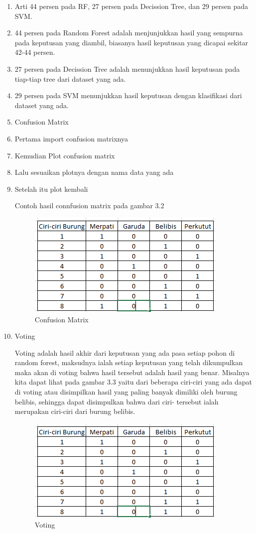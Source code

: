 \begin{enumerate}
\item Arti 44 persen pada RF, 27 persen pada Decission Tree, dan 29 persen pada SVM.
\item 44 persen pada Random Forest adalah menjunjukkan hasil yang sempurna pada keputusan yang diambil, biasanya hasil keputusan yang dicapai sekitar 42-44 persen.
\item 27 persen pada Decission Tree adalah menunjukkan hasil keputusan pada tiap-tiap tree dari dataset yang ada.
\item 29 persen pada SVM menunjukkan hasil keputusan dengan klasifikasi dari dataset yang ada.
\item Confusion Matrix
\item Pertama import confusion matrixnya
\item Kemudian Plot confusion matrix
\item Lalu sesuaikan plotnya dengan nama data yang ada
\item Setelah itu plot kembali
\par
Contoh hasil connfusion matrix pada gambar 3.2
\begin{figure}[ht]
\centering
\includegraphics[scale=0.9]{figures/RF/1_2.png}
\caption{Confusion Matrix}
\end{figure}
\item Voting
\par
Voting adalah hasil akhir dari keputusan yang ada pasa setiap pohon di random forest, maksudnya ialah setiap keputusan yang telah dikumpulkan maka akan di voting bahwa hasil tersebut adalah hasil yang benar. Misalnya kita dapat lihat pada gambar 3.3 yaitu dari beberapa ciri-ciri yang ada dapat di voting atau disimpilkan hasil yang paling banyak dimiliki oleh burung belibis, sehingga dapat disimpulkan bahwa dari ciri- tersebut ialah merupakan ciri-ciri dari burung belibis. 
\begin{figure}[ht]
\centering
\includegraphics[scale=0.9]{figures/RF/1_2.png}
\caption{Voting}
\end{figure}
\end{enumerate}
